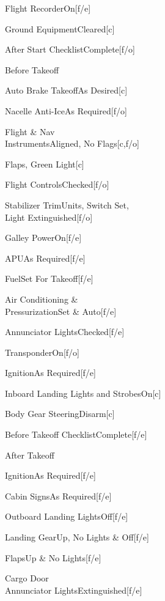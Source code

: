 \documentclass[sim-use, blue_items, halfpage]{checklist}
\begin{document}
\begin{continuedchecklist}
	\item{Flight Recorder}{On}[f/e]
	\item{Ground Equipment}{Cleared}[c]
	\item{After Start Checklist}{Complete}[f/o]
\end{continuedchecklist}

\begin{checklist}{Before Takeoff}
	\item{Auto Brake Takeoff}{As Desired}[c]
	\item{Nacelle Anti-Ice}{As Required}[f/o]
	\item{Flight \& Nav\\Instruments}{Aligned, No Flags}[c,f/o]
	\item{Flaps}{\blank, \blank Green Light}[c]
	\item{Flight Controls}{Checked}[f/o]
	\item{Stabilizer Trim}{\blank Units, Switch Set,\\Light Extinguished}[f/o]
	\item{Galley Power}{On}[f/e]
	\item{APU}{As Required}[f/e]
	\item{Fuel}{Set For Takeoff}[f/e]
	\item{Air Conditioning \&\\Pressurization}{Set \& Auto}[f/e]
	\item{Annunciator Lights}{Checked}[f/e]
	\line
	\item{Transponder}{On}[f/o]
	\item{Ignition}{As Required}[f/e]
	\item{Inboard Landing Lights and Strobes}{On}[c]
	\item{Body Gear Steering}{Disarm}[c]
	\item{Before Takeoff Checklist}{Complete}[f/e]
\end{checklist}

\begin{checklist}{After Takeoff}
	\item{Ignition}{As Required}[f/e]
	\item{Cabin Signs}{As Required}[f/e]
	\item{Outboard Landing Lights}{Off}[f/e]
	\item{Landing Gear}{Up, No Lights \& Off}[f/e]
	\item{Flaps}{Up \& No Lights}[f/e]
	\item{Cargo Door\\Annunciator Lights}{Extinguished}[f/e]
\end{checklist}
\end{document}
